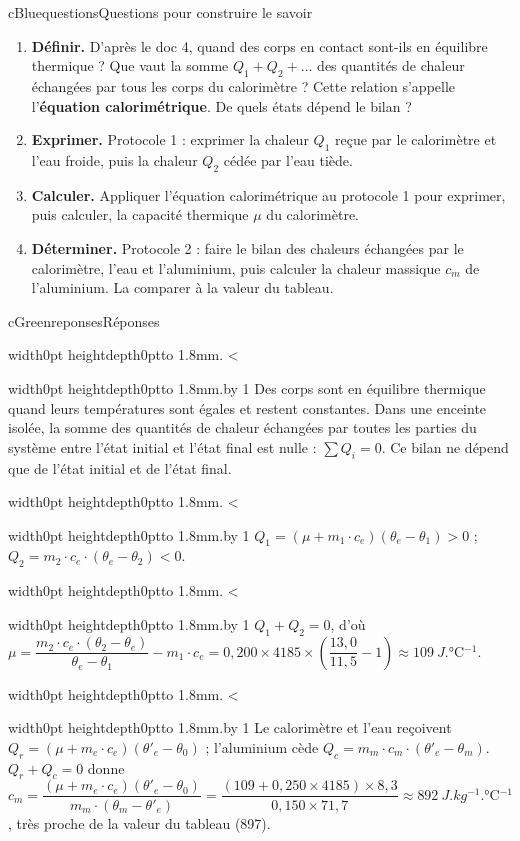 \documentclass[11pt,a4paper]{article}
\newcommand{\kw}[1]{{\sffamily\bfseries\color{cBlue}#1}}   %
\newif\ifeleve
\newlength{\interligne}\setlength{\interligne}{7mm}
\newlength{\replen}
\newcommand{\pointilles}{{\color{cInk2!60}\leaders\hbox to 1.8mm{\hss.\hss}\hfill}\kern0pt}
\newcommand{\lignes}[1]{\leavevmode\vrule width0pt height\dimexpr\interligne-1mm\relax depth0pt\pointilles
  \lgn=1 \loop\ifnum\lgn<#1 \par\nointerlineskip\noindent\vrule width0pt height\interligne depth0pt\pointilles\advance\lgn by 1 \repeat}
\newcommand{\rep}[1]{%
  \ifeleve
    \sbox{\repbox}{\parbox{\linewidth}{#1}}%
    \replen=\dimexpr\ht\repbox+\dp\repbox\relax
    \repn=\numexpr\replen/\baselineskip+1\relax
    \ifnum\repn<2 \repn=2\fi
    \edef\nblignes{\the\repn}\lignes{\nblignes}%
  \else #1\fi}
\newcommand{\titrereponses}{\ifeleve Mes réponses\else Réponses\fi}
\begin{document}
\begin{rub}{cBlue}{questions}{Questions pour construire le savoir}
\begin{enumerate}
  \item \kw{Définir.} D’après le doc 4, quand des corps en contact sont-ils en équilibre thermique ? Que vaut la somme $Q_1 + Q_2 + \dots$ des quantités de chaleur échangées par tous les corps du calorimètre ? Cette relation s’appelle l’\textbf{équation calorimétrique}. De quels états dépend le bilan ?
  \item \kw{Exprimer.} Protocole 1 : exprimer la chaleur $Q_1$ reçue par le calorimètre et l’eau froide, puis la chaleur $Q_2$ cédée par l’eau tiède.
  \item \kw{Calculer.} Appliquer l’équation calorimétrique au protocole 1 pour exprimer, puis calculer, la capacité thermique $\mu$ du calorimètre.
  \item \kw{Déterminer.} Protocole 2 : faire le bilan des chaleurs échangées par le calorimètre, l’eau et l’aluminium, puis calculer la chaleur massique $c_m$ de l’aluminium. La comparer à la valeur du tableau.
\end{enumerate}
\end{rub}

\begin{rub}{cGreen}{reponses}{\titrereponses}
\begin{reps}
  \item \rep{Des corps sont en équilibre thermique quand leurs températures sont égales et restent constantes. Dans une enceinte isolée, la somme des quantités de chaleur échangées par toutes les parties du système entre l’état initial et l’état final est nulle : $\sum Q_i = 0$. Ce bilan ne dépend que de l’état initial et de l’état final.}
  \item \rep{$Q_1 = (\mu + m_1\cdot c_e)(\theta_e - \theta_1) > 0$ ; $Q_2 = m_2\cdot c_e\cdot(\theta_e - \theta_2) < 0$.}
  \item \rep{$Q_1 + Q_2 = 0$, d’où $\mu = \dfrac{m_2\cdot c_e\cdot(\theta_2 - \theta_e)}{\theta_e - \theta_1} - m_1\cdot c_e = 0{,}200\times4185\times\left(\dfrac{13{,}0}{11{,}5} - 1\right) \approx \qty{109}{J.\degreeCelsius^{-1}}$.}
  \item \rep{Le calorimètre et l’eau reçoivent $Q_r = (\mu + m_e\cdot c_e)(\theta'_e - \theta_0)$ ; l’aluminium cède $Q_c = m_m\cdot c_m\cdot(\theta'_e - \theta_m)$. $Q_r + Q_c = 0$ donne $c_m = \dfrac{(\mu + m_e\cdot c_e)(\theta'_e - \theta_0)}{m_m\cdot(\theta_m - \theta'_e)} = \dfrac{(109 + 0{,}250\times4185)\times8{,}3}{0{,}150\times71{,}7} \approx \qty{892}{J.kg^{-1}.\degreeCelsius^{-1}}$, très proche de la valeur du tableau (897).}
\end{reps}
\end{rub}
\end{document}
